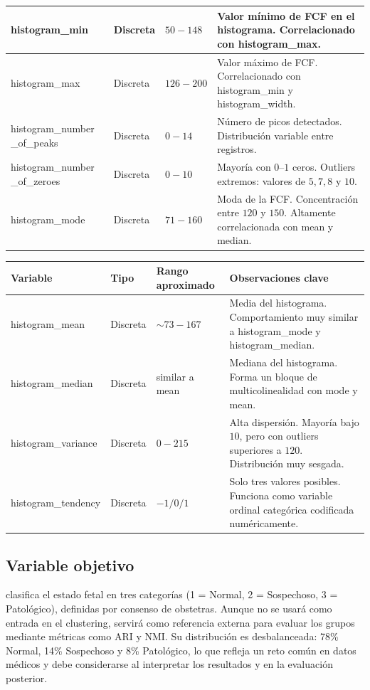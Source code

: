 \documentclass[12pt,letterpaper]{article}
\renewcommand{\arraystretch}{1.30}
\begin{document}
\begin{table}[H]
\begin{tabular}{|p{4.2cm}|p{1.7cm}|p{2.4cm}|p{7cm}|}
\hline
histogram\_min & Discreta & $50 - 148$ & Valor mínimo de FCF en el histograma. Correlacionado con histogram\_max. \\
\hline
histogram\_max & Discreta & $126 - 200$ & Valor máximo de FCF. Correlacionado con histogram\_min y histogram\_width. \\
\hline
histogram\_number \_of\_peaks & Discreta & $0 - 14$ & Número de picos detectados. Distribución variable entre registros. \\
\hline
histogram\_number \_of\_zeroes & Discreta & $0 - 10$ & Mayoría con $0$--$1$ ceros. Outliers extremos: valores de $5, 7, 8$ y $10$. \\
\hline
histogram\_mode & Discreta & $71 - 160$ & Moda de la FCF. Concentración entre $120$ y $150$. Altamente correlacionada con mean y median. \\
\hline
\end{tabular}
\end{table}

\newpage

\begin{table}[H]
\centering
\small
\renewcommand{\arraystretch}{1.3}
\begin{tabular}{|p{4cm}|p{1.7cm}|p{2cm}|p{7cm}|}
\hline
\rowcolor{headbg}
\textbf{Variable} & \textbf{Tipo} & \textbf{Rango aproximado} & \textbf{Observaciones clave} \\
\hline
histogram\_mean & Discreta & $\sim 73 - 167$ & Media del histograma. Comportamiento muy similar a histogram\_mode y histogram\_median. \\
\hline
histogram\_median & Discreta & similar a mean & Mediana del histograma. Forma un bloque de multicolinealidad con mode y mean. \\
\hline
histogram\_variance & Discreta & $0 - 215$ & Alta dispersión. Mayoría bajo $10$, pero con outliers superiores a $120$. Distribución muy sesgada. \\
\hline
histogram\_tendency & Discreta & $-1 / 0 / 1$ & Solo tres valores posibles. Funciona como variable ordinal categórica codificada numéricamente. \\
\hline
\end{tabular}
\end{table}

\subsection{Variable objetivo}

clasifica el estado fetal en tres categorías (1 = Normal, 2 = Sospechoso, 3 = Patológico), definidas por consenso de obstetras. Aunque no se usará como entrada en el clustering, servirá como referencia externa para evaluar los grupos mediante métricas como ARI y NMI. Su distribución es desbalanceada: 78\% Normal, 14\% Sospechoso y 8\% Patológico, lo que refleja un reto común en datos médicos y debe considerarse al interpretar los resultados y en la evaluación posterior.
\end{document}
